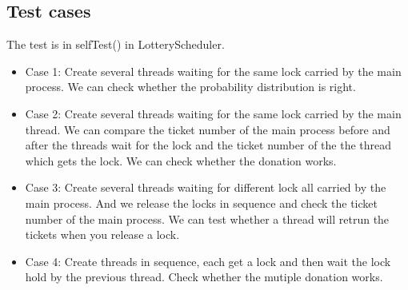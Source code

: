 \documentclass[a4paper,10pt]{article}
\begin{document}
\subsection{Test cases}
The test is in selfTest() in LotteryScheduler.
\begin{itemize}
\item Case 1: Create several threads waiting for the same lock carried by the main process. We can check whether the probability distribution is right.
\item Case 2: Create several threads waiting for the same lock carried by the main thread. We can compare the ticket number of the main process before and after the threads wait for the lock and the ticket number of the the thread which gets the lock. We can check whether the donation works.
\item Case 3: Create several threads waiting for different lock all carried by the main process. And we release the locks in sequence and check the ticket number of the main process. We can test whether a thread will retrun the tickets when you release a lock.
\item Case 4: Create threads in sequence, each get a lock and then wait the lock hold by the previous thread. Check whether the mutiple donation works.


\end{itemize}
\end{document}
